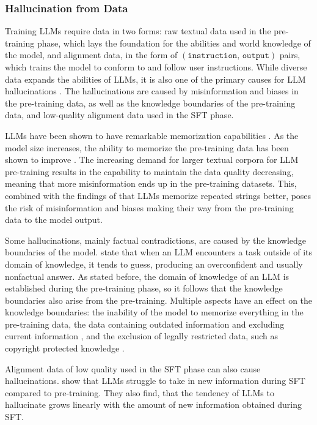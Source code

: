 \documentclass[english, 12pt, a4paper, sci, utf8, a-2b, online]{../definitions/aaltothesis}
\begin{document}
\subsubsection{Hallucination from Data} \label{sec:data_hallucination}

Training LLMs require data in two forms: raw textual data used in the pre-training phase, which lays the foundation for the abilities and world knowledge of the model, and alignment data, in the form of $(\texttt{instruction, output})$ pairs, which trains the model to conform to and follow user instructions. While diverse data expands the abilities of LLMs, it is also one of the primary causes for LLM hallucinations \cite{Kalai2025-fl}. The hallucinations are caused by misinformation and biases in the pre-training data, as well as the knowledge boundaries of the pre-training data, and low-quality alignment data used in the SFT phase.

LLMs have been shown to have remarkable memorization capabilities \cite{carlini2023quantifyingmemorizationneurallanguage}. As the model size increases, the ability to memorize the pre-training data has been shown to improve \cite{JMLR:v24:22-1144}. The increasing demand for larger textual corpora for LLM pre-training results in the capability to maintain the data quality decreasing, meaning that more misinformation ends up in the pre-training datasets. This, combined with the findings of \textcite{carlini2023quantifyingmemorizationneurallanguage} that LLMs memorize repeated strings better, poses the risk of misinformation and biases making their way from the pre-training data to the model output.

Some hallucinations, mainly factual contradictions, are caused by the knowledge boundaries of the model. \textcite{Kalai2025-fl} state that when an LLM encounters a task outside of its domain of knowledge, it tends to guess, producing an overconfident and usually nonfactual answer. As stated before, the domain of knowledge of an LLM is established during the pre-training phase, so it follows that the knowledge boundaries also arise from the pre-training. Multiple aspects have an effect on the knowledge boundaries: the inability of the model to memorize everything in the pre-training data, the data containing outdated information and excluding current information  \cite{onoe-etal-2022-entity}, and the exclusion of legally restricted data, such as copyright protected knowledge \cite{min2024silolanguagemodelsisolating}.

Alignment data of low quality used in the SFT phase can also cause hallucinations. \textcite{gekhman2024doesfinetuningllmsnew} show that LLMs struggle to take in new information during SFT compared to pre-training. They also find, that the tendency of LLMs to hallucinate grows linearly with the amount of new information obtained during SFT.
\end{document}
